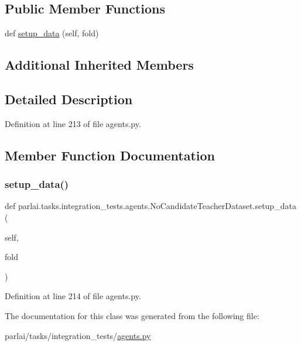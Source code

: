 \subsection*{Public Member Functions}
\begin{DoxyCompactItemize}
\item 
def \hyperlink{classparlai_1_1tasks_1_1integration__tests_1_1agents_1_1NoCandidateTeacherDataset_a668aa7a9cad783f8e0a7f318271dda76}{setup\+\_\+data} (self, fold)
\end{DoxyCompactItemize}
\subsection*{Additional Inherited Members}


\subsection{Detailed Description}


Definition at line 213 of file agents.\+py.



\subsection{Member Function Documentation}
\mbox{\label{classparlai_1_1tasks_1_1integration__tests_1_1agents_1_1NoCandidateTeacherDataset_a668aa7a9cad783f8e0a7f318271dda76}} 
\subsubsection{\texorpdfstring{setup\+\_\+data()}{setup\_data()}}
{\footnotesize\ttfamily def parlai.\+tasks.\+integration\+\_\+tests.\+agents.\+No\+Candidate\+Teacher\+Dataset.\+setup\+\_\+data (\begin{DoxyParamCaption}\item[{}]{self,  }\item[{}]{fold }\end{DoxyParamCaption})}



Definition at line 214 of file agents.\+py.



The documentation for this class was generated from the following file\+:\begin{DoxyCompactItemize}
\item 
parlai/tasks/integration\+\_\+tests/\hyperlink{parlai_2tasks_2integration__tests_2agents_8py}{agents.\+py}\end{DoxyCompactItemize}
